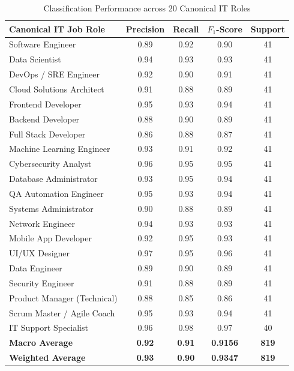\documentclass[conference]{IEEEtran}
\begin{document}
\begin{table}[t]
\centering
\caption{Classification Performance across 20 Canonical IT Roles}
\label{tab:c1_per_role}
\begin{tabular}{@{}lcccc@{}}
\toprule
\textbf{Canonical IT Job Role} & \textbf{Precision} & \textbf{Recall} & \textbf{$F_1$-Score} & \textbf{Support} \\
\midrule
Software Engineer & 0.89 & 0.92 & 0.90 & 41 \\
Data Scientist & 0.94 & 0.93 & 0.93 & 41 \\
DevOps / SRE Engineer & 0.92 & 0.90 & 0.91 & 41 \\
Cloud Solutions Architect & 0.91 & 0.88 & 0.89 & 41 \\
Frontend Developer & 0.95 & 0.93 & 0.94 & 41 \\
Backend Developer & 0.88 & 0.90 & 0.89 & 41 \\
Full Stack Developer & 0.86 & 0.88 & 0.87 & 41 \\
Machine Learning Engineer & 0.93 & 0.91 & 0.92 & 41 \\
Cybersecurity Analyst & 0.96 & 0.95 & 0.95 & 41 \\
Database Administrator & 0.93 & 0.95 & 0.94 & 41 \\
QA Automation Engineer & 0.95 & 0.93 & 0.94 & 41 \\
Systems Administrator & 0.90 & 0.88 & 0.89 & 41 \\
Network Engineer & 0.94 & 0.93 & 0.93 & 41 \\
Mobile App Developer & 0.92 & 0.95 & 0.93 & 41 \\
UI/UX Designer & 0.97 & 0.95 & 0.96 & 41 \\
Data Engineer & 0.89 & 0.90 & 0.89 & 41 \\
Security Engineer & 0.91 & 0.88 & 0.89 & 41 \\
Product Manager (Technical) & 0.88 & 0.85 & 0.86 & 41 \\
Scrum Master / Agile Coach & 0.95 & 0.93 & 0.94 & 41 \\
IT Support Specialist & 0.96 & 0.98 & 0.97 & 40 \\
\midrule
\textbf{Macro Average} & \textbf{0.92} & \textbf{0.91} & \textbf{0.9156} & \textbf{819} \\
\textbf{Weighted Average} & \textbf{0.93} & \textbf{0.90} & \textbf{0.9347} & \textbf{819} \\
\bottomrule
\end{tabular}
\end{table}
\end{document}
